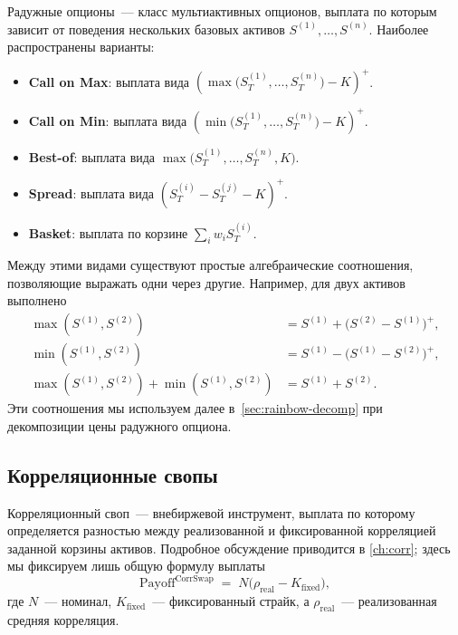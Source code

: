 Радужные опционы~--- класс мультиактивных опционов, выплата по которым
зависит от поведения нескольких базовых активов $S^{(1)},\dots,S^{(n)}$.
Наиболее распространены варианты:

\begin{itemize}
  \item \textbf{Call on Max}: выплата вида
        $\left(\max\bigl(S^{(1)}_T,\dots,S^{(n)}_T\bigr) - K\right)^{+}$.
  \item \textbf{Call on Min}: выплата вида
        $\left(\min\bigl(S^{(1)}_T,\dots,S^{(n)}_T\bigr) - K\right)^{+}$.
  \item \textbf{Best-of}: выплата вида
        $\max\bigl(S^{(1)}_T,\dots, S^{(n)}_T, K \bigr)$.
  \item \textbf{Spread}: выплата вида
        $\left(S^{(i)}_T - S^{(j)}_T - K\right)^{+}$.
  \item \textbf{Basket}: выплата по корзине $\sum_i w_i S^{(i)}_T$.
\end{itemize}

Между этими видами существуют простые алгебраические соотношения,
позволяющие выражать одни через другие. Например, для двух активов
выполнено
\begin{align}
  \max(S^{(1)},S^{(2)}) &= S^{(1)} + \bigl(S^{(2)}-S^{(1)}\bigr)^{+},\\
  \min(S^{(1)},S^{(2)}) &= S^{(1)} - \bigl(S^{(1)}-S^{(2)}\bigr)^{+},\\
  \max(S^{(1)},S^{(2)}) + \min(S^{(1)},S^{(2)}) &= S^{(1)}+S^{(2)}.
\end{align}
Эти соотношения мы используем далее в~\cref{sec:rainbow-decomp} при
декомпозиции цены радужного опциона.

\subsection{Корреляционные свопы}
\label{sec:corr-swap-intro}

Корреляционный своп~--- внебиржевой инструмент, выплата по которому
определяется разностью между реализованной и фиксированной корреляцией
заданной корзины активов. Подробное обсуждение приводится в
\cref{ch:corr}; здесь мы фиксируем лишь общую формулу выплаты
\begin{equation}
  \text{Payoff}^{\text{CorrSwap}}
  \;=\; N\bigl(\rho_{\text{real}} - K_{\text{fixed}}\bigr),
\end{equation}
где $N$~--- номинал, $K_{\text{fixed}}$~--- фиксированный страйк,
а $\rho_{\text{real}}$~--- реализованная средняя корреляция.

